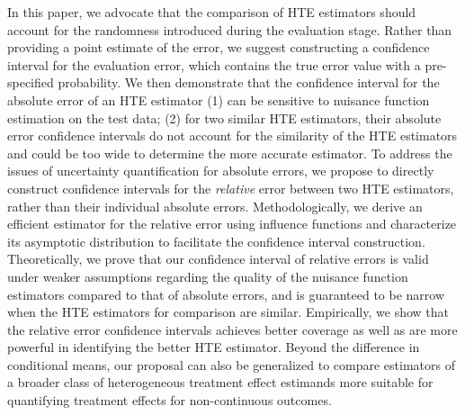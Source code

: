 \documentclass{article}
\newcommand{\zg}[1]{{\color{blue} [ZG: #1]}}
\theoremstyle{plain}
\theoremstyle{definition}
\theoremstyle{plain}
\begin{document}


In this paper, we advocate that the comparison of HTE estimators should account for the randomness introduced during the evaluation stage. 
Rather than providing a point estimate of the error, we suggest constructing a confidence interval for the evaluation error, which contains the true error value with a pre-specified probability.
We then demonstrate that the confidence interval for the absolute error of an HTE estimator (1) can be sensitive to nuisance function estimation on the test data; (2) for two similar HTE estimators, their absolute error confidence intervals do not account for the similarity of the HTE estimators and could be too wide to determine the more accurate estimator.
To address the issues of uncertainty quantification for absolute errors, we propose to directly construct confidence intervals for the \textit{relative} error between two HTE estimators, rather than their individual absolute errors. 
Methodologically, we derive an efficient estimator for the relative error using influence functions and characterize its asymptotic distribution to facilitate the confidence interval construction. 
Theoretically, we prove that our confidence interval of relative errors is valid under weaker assumptions regarding the quality of the nuisance function estimators compared to that of absolute errors, and is guaranteed to be narrow when the HTE estimators for comparison are similar.
Empirically, we show that the relative error confidence intervals achieves better coverage as well as are more powerful in identifying the better HTE estimator.
Beyond the difference in conditional means, our proposal can also be generalized to compare estimators of a broader class of heterogeneous treatment effect estimands more suitable for quantifying treatment effects for non-continuous outcomes.
\end{document}
